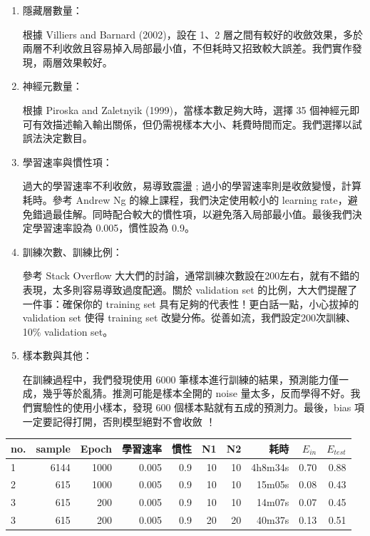 \begin{enumerate}[itemsep=-0.5ex, topsep=0ex]
\item 隱藏層數量：

根據 Villiers and Barnard (2002)，設在 1、2 層之間有較好的收斂效果，多於兩層不利收斂且容易掉入局部最小值，不但耗時又招致較大誤差。我們實作發現，兩層效果較好。

\item 神經元數量：

根據 Piroska and Zaletnyik (1999)，當樣本數足夠大時，選擇  35 個神經元即可有效描述輸入輸出關係，但仍需視樣本大小、耗費時間而定。我們選擇以試誤法決定數目。

\item 學習速率與慣性項：

過大的學習速率不利收斂，易導致震盪 ; 過小的學習速率則是收斂變慢，計算耗時。參考 Andrew Ng 的線上課程，我們決定使用較小的 learning rate，避免錯過最佳解。同時配合較大的慣性項，以避免落入局部最小值。最後我們決定學習速率設為 0.005，慣性設為 0.9。

\item  訓練次數、訓練比例：

參考 Stack Overflow 大大們的討論，通常訓練次數設在200左右，就有不錯的表現，太多則容易導致過度配適。關於 validation set 的比例，大大們提醒了一件事：確保你的 training set 具有足夠的代表性！更白話一點，小心拔掉的  validation set 使得  training set 改變分佈。從善如流，我們設定200次訓練、10\% validation set。

\item 樣本數與其他：

在訓練過程中，我們發現使用 6000 筆樣本進行訓練的結果，預測能力僅一成，幾乎等於亂猜。推測可能是樣本全開的  noise 量太多，反而學得不好。我們實驗性的使用小樣本，發現 600 個樣本點就有五成的預測力。最後，bias 項一定要記得打開，否則模型絕對不會收斂 ！
\end{enumerate}

\begin{table}[htb]
\centering
\begin{threeparttable}
    \begin{tabular}{lrrrrrrrrr}
        \toprule
        no.&   sample&   Epoch&    學習速率&    慣性&   N1&   N2&       耗時&   $E_{in}$&  $E_{test}$\\
        \midrule
        1&     6144&    1000&   0.005&   0.9&   10&   10&   4h8m34s&   0.70&   0.88\\
        2&      615&    1000&   0.005&   0.9&   10&   10&    15m05s&   0.08&   0.43\\
        3&      615&     200&   0.005&   0.9&   10&   10&    14m07s&   0.07&   0.45\\
        3&      615&     200&   0.005&   0.9&   20&   20&    40m37s&   0.13&   0.51\\
        \bottomrule
    \end{tabular}
\end{threeparttable}
\end{table}

